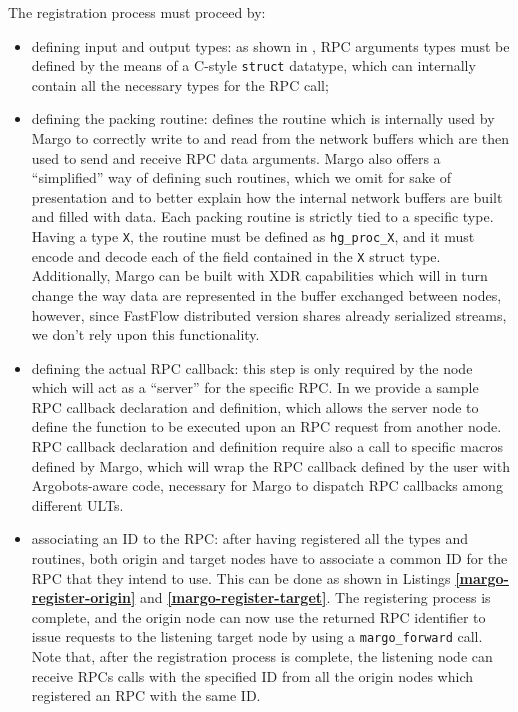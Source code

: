 The registration process must proceed by:
\begin{itemize}
    \item defining input and output types: as shown in , RPC arguments types must be defined by the means of a C-style \texttt{struct} datatype, which can internally contain all the necessary types for the RPC call;
    \item defining the packing routine:  defines the routine which is internally used by Margo to correctly write to and read from the network buffers which are then used to send and receive RPC data arguments. Margo also offers a ``simplified'' way of defining such routines, which we omit for sake of presentation and to better explain how the internal network buffers are built and filled with data. Each packing routine is strictly tied to a specific type. Having a type \texttt{X}, the routine must be defined as \texttt{hg\_proc\_X}, and it must encode and decode each of the field contained in the \texttt{X} struct type. Additionally, Margo can be built with XDR capabilities which will in turn change the way data are represented in the buffer exchanged between nodes, however, since FastFlow distributed version shares already serialized streams, we don't rely upon this functionality.
    \item defining the actual RPC callback: this step is only required by the node which will act as a ``server'' for the specific RPC. In  we provide a sample RPC callback declaration and definition, which allows the server node to define the function to be executed upon an RPC request from another node. RPC callback declaration and definition require also a call to specific macros defined by Margo, which will wrap the RPC callback defined by the user with Argobots-aware code, necessary for Margo to dispatch RPC callbacks among different ULTs.
    \item associating an ID to the RPC: after having registered all the types and routines, both origin and target nodes have to associate a common ID for the RPC that they intend to use. This can be done as shown in Listings \textbf{\ref{margo-register-origin}} and \textbf{\ref{margo-register-target}}. The registering process is complete, and the origin node can now use the returned RPC identifier to issue requests to the listening target node by using a \texttt{margo\_forward} call. Note that, after the registration process is complete, the listening node can receive RPCs calls with the specified ID from all the origin nodes which registered an RPC with the same ID.  
\end{itemize}


